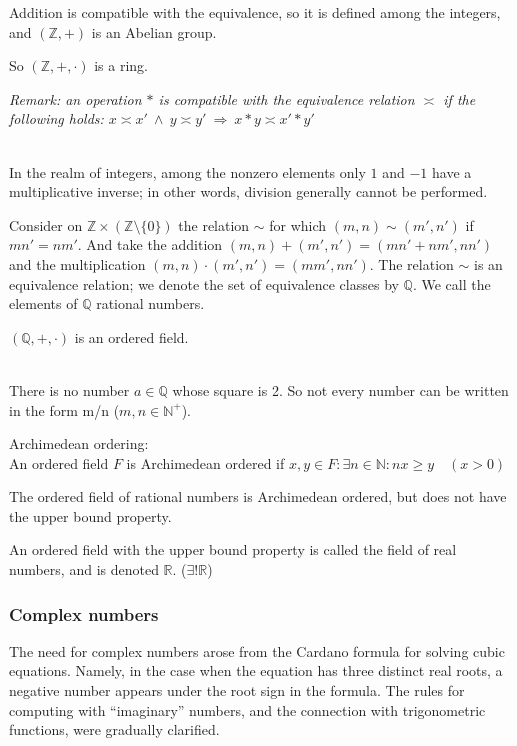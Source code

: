 \documentclass[margin=0px]{article}
\newcommand{\N}{\mathbb{N}}
\newcommand{\Z}{\mathbb{Z}}
\newcommand{\R}{\mathbb{R}}
\newcommand{\Q}{\mathbb{Q}}
\begin{document}
\begin{description}
        Addition is compatible with the equivalence, so it is defined among the integers, and $(\Z, +)$ is an Abelian group.

        So $(\Z, +, \cdot)$ is a ring.

        \textit{Remark: an operation $*$ is compatible with the equivalence relation $\asymp$ if the following holds: $ x \asymp x' \ \land \ y \asymp y' \ \Longrightarrow \ x * y \asymp x'*y'$}
    \item[Rational numbers] \hfill \\
        In the realm of integers, among the nonzero elements only $1$ and $-1$ have a multiplicative inverse; in other words, division generally cannot be performed.

        Consider on $\Z \times (\Z\setminus\{0\})$ the relation $\sim$ for which $(m,n) \sim (m',n')$ if $mn' = nm'$. And take the addition $(m,n)+(m',n') = (mn'+nm', nn')$ and the multiplication $(m,n)\cdot(m',n')=(mm', nn')$. The relation $\sim$ is an equivalence relation; we denote the set of equivalence classes by $\Q$. We call the elements of $\Q$ rational numbers.

        $(\Q, +, \cdot)$ is an ordered field.
    \item[Real numbers] \hfill \\
        There is no number $a \in \Q$ whose square is 2. So not every number can be written in the form m/n ($m,n \in \N^+$).

        Archimedean ordering:\\
        An ordered field $F$ is Archimedean ordered if $x,y\in F: \exists n \in \N : nx \geq y \quad (x>0)$

        The ordered field of rational numbers is Archimedean ordered, but does not have the upper bound property.

        An ordered field with the upper bound property is called the field of real numbers, and is denoted $\R$. ($\exists!\R$)
\end{description}
\subsubsection{Complex numbers}
The need for complex numbers arose from the Cardano formula for solving cubic equations. Namely, in the case when the equation has three distinct real roots, a negative number appears under the root sign in the formula. The rules for computing with ``imaginary'' numbers, and the connection with trigonometric functions, were gradually clarified.
\end{document}
